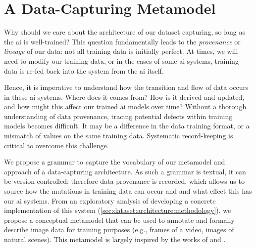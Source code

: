 \section{A Data-Capturing Metamodel}
\label{sec:dataset:architecture}

Why should we care about the architecture of our dataset capturing, so long as the \gls{ai} is well-trained? This question fundamentally leads to the \textit{provenance} or \textit{lineage} of our data: not all training data is initially perfect. At times, we will need to modify our training data, or in the cases of some \gls{ai} systems, training data is re-fed back into the system from the \gls{ai} itself. 

Hence, it is imperative to understand how the transition and flow of data occurs \citep{Cui:2003im,Ikeda:2009ca,Buneman:2000bn} in these \gls{ai} systems. Where does it comes from? How is it derived and updated, and how might this affect our trained \gls{ai} models over time? Without a thorough understanding of data provenance, tracing potential defects within training models becomes difficult. It may be a difference in the data training format, or a mismatch of values on the same training data. Systematic record-keeping is critical to overcome this challenge.

We propose a grammar to capture the vocabulary of our metamodel and  approach of a data-capturing architecture. As such a grammar is textual, it can be version controlled: therefore data provenance is recorded, which allows us to source how the mutations in training data can occur and and what effect this has our \gls{ai} systems. From an exploratory analysis of developing a concrete implementation of this system (\cref{sec:dataset:architecture:methodology}), we propose a conceptual metamodel that can be used to annotate and formally describe image data for training purposes (e.g., frames of a video, images of natural scenes). This metamodel is largely inspired by the works of \citet{Wickham:2010hy, Wickham:2007tu} and \citet{Moody:2009vo}.




